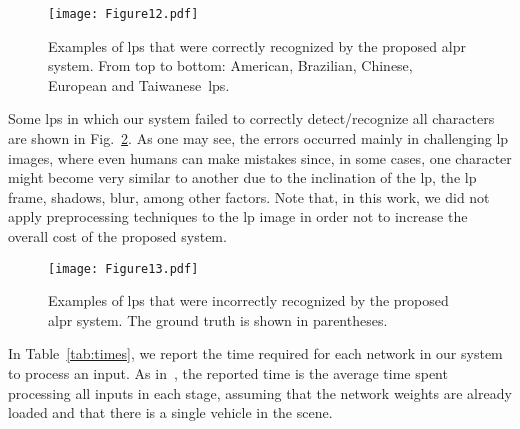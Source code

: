 \begin{figure}[!htb]
	\centering
    
    \texttt{[image: Figure12.pdf]}
    
    \vspace{-2mm}

	\caption{Examples of \glspl*{lp} that were correctly recognized by the proposed \gls*{alpr} system. From top to bottom: American, Brazilian, Chinese, European and Taiwanese~\glspl*{lp}.}
    \label{fig:results:lp_recognition_correct}  
\end{figure}

Some \glspl*{lp} in which our system failed to correctly detect/recognize all characters are shown in Fig.~\ref{fig:results:lp_recognition_wrong}. As one may see, the errors occurred mainly in challenging \gls*{lp} images, where even humans can make mistakes since, in some cases, one character might become very similar to another due to the inclination of the \gls*{lp}, the \gls*{lp} frame, shadows, blur, among other factors. 
Note that, in this work, we did not apply preprocessing techniques to the \gls*{lp} image in order not to increase the overall cost of the proposed system.

\begin{figure}[!htb]
	\centering
    
    \texttt{[image: Figure13.pdf]}
    
    \vspace{-2mm}

	\caption{Examples of \glspl*{lp} that were incorrectly recognized by the proposed \gls*{alpr} system.
	The ground truth is shown in parentheses.}
    \label{fig:results:lp_recognition_wrong}  
\end{figure}



In Table~\ref{tab:times}, we report the time required for each network in our system to process an input.
As in~\citep{silva2017realtime,laroca2018robust,silva2020realtime}, the reported time is the average time spent processing all inputs in each stage, assuming that the network weights are already loaded and that there is a single vehicle in the scene.

